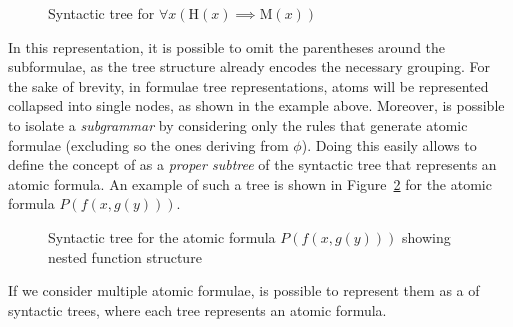 \begin{figure}[H]
    \centering
    \caption{Syntactic tree for \(\forall x (\text{H}(x) \implies \text{M}(x))\)}\label{fig:syntactic_tree}
\end{figure}

In this representation, it is possible to omit the parentheses around the subformulae, as the tree structure already encodes the necessary grouping.
For the sake of brevity, in formulae tree representations, atoms will be represented collapsed into single nodes, as shown in the example above.
Moreover, is possible to isolate a \emph{subgrammar} by considering only the rules that generate atomic formulae (excluding so the ones deriving from \(\phi\)). Doing this easily allows to define the concept of  as a \emph{proper subtree} of the syntactic tree that represents an atomic formula.
An example of such a tree is shown in Figure~\ref{fig:subterm_tree} for the atomic formula \(P(f(x, g(y)))\).
\begin{figure}[H]
    \centering
    \caption{Syntactic tree for the atomic formula \(P(f(x, g(y)))\) showing nested function structure}\label{fig:subterm_tree}
\end{figure}

If we consider multiple atomic formulae, is possible to represent them as a  of syntactic trees, where each tree represents an atomic formula.

